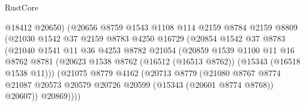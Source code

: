 \begin{lexlean}{RustCore}
\begin{coremodule}
                                @18412
                                @20650)
                              (@20656
                                @8759
                                @1543
                                @1108
                                @114
                                @2159
                                @8784
                                @2159
                                @8809
                                (@21030
                                  @1542
                                  @37
                                  @2159
                                  @8783
                                  @4250
                                  @16729
                                  (@20854
                                    @1542
                                    @37
                                    @8783
                                    (@21040
                                      @1541
                                      @11
                                      @36
                                      @4253
                                      @8782
                                      @21054
                                      (@20859
                                        @1539
                                        @1100
                                        @11
                                        @16
                                        @8762
                                        @8781
                                        (@20623
                                          @1538
                                          @8762
                                          (@16512 (@16513 @8762))
                                          (@15343 (@16518 @1538 @11)))
                                        (@21075
                                          @8779
                                          @4162
                                          (@20713
                                            @8779
                                            (@21080
                                              @8767
                                              @8774
                                              @21087
                                              @20573
                                              @20579
                                              @20726
                                              @20599
                                              (@15343 (@20601 @8774 @8768))
                                              @20607))
                                          @20869))))

\end{coremodule}
\end{lexlean}
